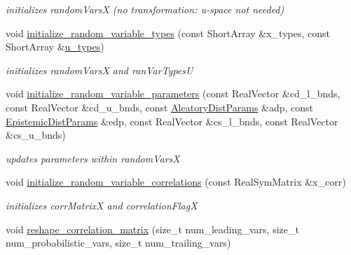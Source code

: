 \begin{DoxyCompactItemize}
\begin{DoxyCompactList}\small\item\em initializes random\+VarsX (no transformation\+: u-\/space not needed) \end{DoxyCompactList}\item 
void \hyperlink{classPecos_1_1ProbabilityTransformation_a6c2e8f1862c69eff4d208fd3e63f0da3}{initialize\+\_\+random\+\_\+variable\+\_\+types} (const Short\+Array \&x\+\_\+types, const Short\+Array \&\hyperlink{classPecos_1_1ProbabilityTransformation_a287eedacfbb64c6d3271ab71913a27e5}{u\+\_\+types})\label{classPecos_1_1ProbabilityTransformation_a6c2e8f1862c69eff4d208fd3e63f0da3}

\begin{DoxyCompactList}\small\item\em initializes random\+VarsX and ran\+Var\+TypesU \end{DoxyCompactList}\item 
void \hyperlink{classPecos_1_1ProbabilityTransformation_aa0912f3747534a9a6977352c5553d7e4}{initialize\+\_\+random\+\_\+variable\+\_\+parameters} (const Real\+Vector \&cd\+\_\+l\+\_\+bnds, const Real\+Vector \&cd\+\_\+u\+\_\+bnds, const \hyperlink{classPecos_1_1AleatoryDistParams}{Aleatory\+Dist\+Params} \&adp, const \hyperlink{classPecos_1_1EpistemicDistParams}{Epistemic\+Dist\+Params} \&edp, const Real\+Vector \&cs\+\_\+l\+\_\+bnds, const Real\+Vector \&cs\+\_\+u\+\_\+bnds)\label{classPecos_1_1ProbabilityTransformation_aa0912f3747534a9a6977352c5553d7e4}

\begin{DoxyCompactList}\small\item\em updates parameters within random\+VarsX \end{DoxyCompactList}\item 
void \hyperlink{classPecos_1_1ProbabilityTransformation_a46684cea1e3dbc10e584cd6e8a9c730c}{initialize\+\_\+random\+\_\+variable\+\_\+correlations} (const Real\+Sym\+Matrix \&x\+\_\+corr)\label{classPecos_1_1ProbabilityTransformation_a46684cea1e3dbc10e584cd6e8a9c730c}

\begin{DoxyCompactList}\small\item\em initializes corr\+MatrixX and correlation\+FlagX \end{DoxyCompactList}\item 
void \hyperlink{classPecos_1_1ProbabilityTransformation_a04069ae1e64fd6b0781d0f593f10776e}{reshape\+\_\+correlation\+\_\+matrix} (size\+\_\+t num\+\_\+leading\+\_\+vars, size\+\_\+t num\+\_\+probabilistic\+\_\+vars, size\+\_\+t num\+\_\+trailing\+\_\+vars)\label{classPecos_1_1ProbabilityTransformation_a04069ae1e64fd6b0781d0f593f10776e}


\end{DoxyCompactItemize}
